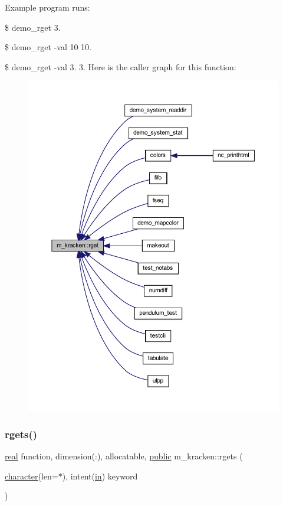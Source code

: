 Example program runs\+:

\$ demo\+\_\+rget 3.

\$ demo\+\_\+rget -\/val 10 10.

\$ demo\+\_\+rget -\/val 3. 3. Here is the caller graph for this function\+:
\nopagebreak
\begin{figure}[H]
\begin{center}
\leavevmode
\includegraphics[width=350pt]{namespacem__kracken_a21e0e40932af79430832a53bdb4de300_icgraph}
\end{center}
\end{figure}
\mbox{\label{namespacem__kracken_aa1a29fad1518c15d8710d273755a17cc}} 
\subsubsection{\texorpdfstring{rgets()}{rgets()}}
{\footnotesize\ttfamily \hyperlink{read__watch_83_8txt_abdb62bde002f38ef75f810d3a905a823}{real} function, dimension(\+:), allocatable, \hyperlink{M__stopwatch_83_8txt_a2f74811300c361e53b430611a7d1769f}{public} m\+\_\+kracken\+::rgets (\begin{DoxyParamCaption}\item[{\hyperlink{option__stopwatch_83_8txt_abd4b21fbbd175834027b5224bfe97e66}{character}(len=$\ast$), intent(\hyperlink{M__journal_83_8txt_afce72651d1eed785a2132bee863b2f38}{in})}]{keyword }\end{DoxyParamCaption})}



